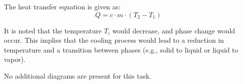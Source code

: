 The heat transfer equation is given as:  
\[
Q = c \cdot m \cdot (T_2 - T_1)
\]  

It is noted that the temperature \( T_i \) would decrease, and phase change would occur. This implies that the cooling process would lead to a reduction in temperature and a transition between phases (e.g., solid to liquid or liquid to vapor).  

No additional diagrams are present for this task.
